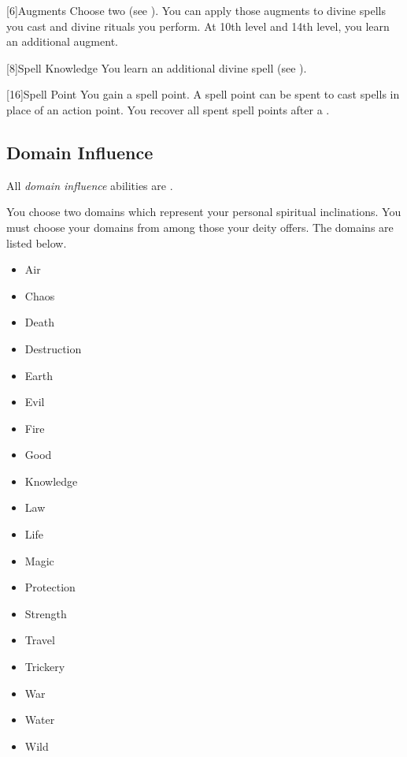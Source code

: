             [6]{Augments}
            Choose two  (see ).
            You can apply those augments to divine spells you cast and divine rituals you perform.
            At 10th level and 14th level, you learn an additional augment.

            [8]{Spell Knowledge}
            You learn an additional divine spell (see ).

            [16]{Spell Point} 
            You gain a spell point.
            A spell point can be spent to cast spells in place of an action point.
            You recover all spent spell points after a .

        \subsection{Domain Influence}
            All \textit{domain influence} abilities are .

            You choose two domains which represent your personal spiritual inclinations.
            You must choose your domains from among those your deity offers.
            The domains are listed below.

            \begin{itemize}
                \item{Air}
                \item{Chaos}
                \item{Death}
                \item{Destruction}
                \item{Earth}
                \item{Evil}
                \item{Fire}
                \item{Good}
                \item{Knowledge}
                \item{Law}
                \item{Life}
                \item{Magic}
                \item{Protection}
                \item{Strength}
                \item{Travel}
                \item{Trickery}
                \item{War}
                \item{Water}
                \item{Wild}
            \end{itemize}

